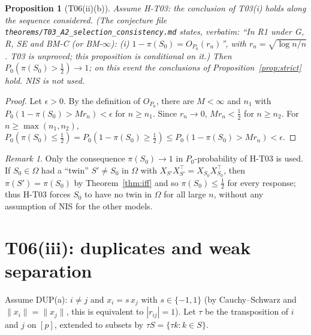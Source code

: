 \documentclass[11pt]{article}
\newtheorem{proposition}[theorem]{Proposition}
\theoremstyle{remark}
\newtheorem{remark}[theorem]{Remark}
\begin{document}
\begin{proposition}[T06(ii)(b)]\label{prop:prob}
Assume H-T03: the conclusion of T03(i) holds along the sequence considered. (The conjecture file \texttt{theorems/T03\_A2\_selection\_consistency.md} states, verbatim: ``In R1 under G, R, SE and BM-C (or BM-$\infty$): (i) $1-\pi(S_0)=O_{P_0}(r_n)$'', with $r_n=\sqrt{\log n/n}$. T03 is unproved; this proposition is conditional on it.) Then $P_0(\pi(S_0)>\tfrac12)\to1$; on this event the conclusions of Proposition~\ref{prop:strict} hold. NIS is not used.
\end{proposition}
\begin{proof}
Let $\epsilon>0$. By the definition of $O_{P_0}$, there are $M<\infty$ and $n_1$ with $P_0(1-\pi(S_0)>Mr_n)<\epsilon$ for $n\ge n_1$. Since $r_n\to0$, $Mr_n<\tfrac12$ for $n\ge n_2$. For $n\ge\max(n_1,n_2)$, $P_0(\pi(S_0)\le\tfrac12)=P_0(1-\pi(S_0)\ge\tfrac12)\le P_0(1-\pi(S_0)>Mr_n)<\epsilon$.
\end{proof}

\begin{remark}
Only the consequence $\pi(S_0)\to1$ in $P_0$-probability of H-T03 is used. If $S_0\in\Omega$ had a ``twin'' $S'\ne S_0$ in $\Omega$ with $X_{S'}X_{S'}^\top=X_{S_0}X_{S_0}^\top$, then $\pi(S')=\pi(S_0)$ by Theorem~\ref{thm:iff} and so $\pi(S_0)\le\tfrac12$ for every response; thus H-T03 forces $S_0$ to have no twin in $\Omega$ for all large $n$, without any assumption of NIS for the other models.
\end{remark}

\section{T06(iii): duplicates and weak separation}\label{sec:T06iii}

Assume DUP(a): $i\ne j$ and $x_i=s\,x_j$ with $s\in\{-1,1\}$ (by Cauchy--Schwarz and $\|x_i\|=\|x_j\|$, this is equivalent to $|r_{ij}|=1$). Let $\tau$ be the transposition of $i$ and $j$ on $[p]$, extended to subsets by $\tau S=\{\tau k:k\in S\}$.
\end{document}
